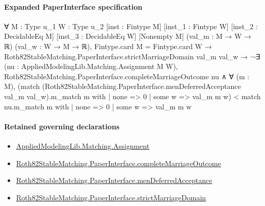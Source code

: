 \documentclass[10pt]{article}
\begin{document}
\paragraph{Expanded PaperInterface specification}
\begin{ReviewVerbatim}
∀ {M : Type u_1} {W : Type u_2} [inst : Fintype M] [inst_1 : Fintype W] [inst_2 : DecidableEq M]
  [inst_3 : DecidableEq W] [Nonempty M] (val_m : M → W → ℝ) (val_w : W → M → ℝ),
  Fintype.card M = Fintype.card W →
    Roth82StableMatching.PaperInterface.strictMarriageDomain val_m val_w →
      ¬∃ (nu : AppliedModelingLib.Matching.Assignment M W),
          Roth82StableMatching.PaperInterface.completeMarriageOutcome nu ∧
            ∀ (m : M),
              (match (Roth82StableMatching.PaperInterface.menDeferredAcceptance val_m val_w).m_match m with
                | none => 0
                | some w => val_m m w) <
                match nu.m_match m with
                | none => 0
                | some w => val_m m w
\end{ReviewVerbatim}

\paragraph{Retained governing declarations}
\begin{itemize}\raggedright
\item \hyperlink{governing-declaration-508c084086b006b8}{Applied\allowbreak{}Modeling\allowbreak{}Lib.\allowbreak{}Matching.\allowbreak{}Assignment}
\item \hyperlink{paper-prerequisite-efa58a68b1c17a47}{Roth82\allowbreak{}Stable\allowbreak{}Matching.\allowbreak{}Paper\allowbreak{}Interface.\allowbreak{}complete\allowbreak{}Marriage\allowbreak{}Outcome}
\item \hyperlink{governing-declaration-7357e0557237bc7e}{Roth82\allowbreak{}Stable\allowbreak{}Matching.\allowbreak{}Paper\allowbreak{}Interface.\allowbreak{}men\allowbreak{}Deferred\allowbreak{}Acceptance}
\item \hyperlink{governing-declaration-d06ec2a2987f0c72}{Roth82\allowbreak{}Stable\allowbreak{}Matching.\allowbreak{}Paper\allowbreak{}Interface.\allowbreak{}strict\allowbreak{}Marriage\allowbreak{}Domain}
\end{itemize}
\end{document}

